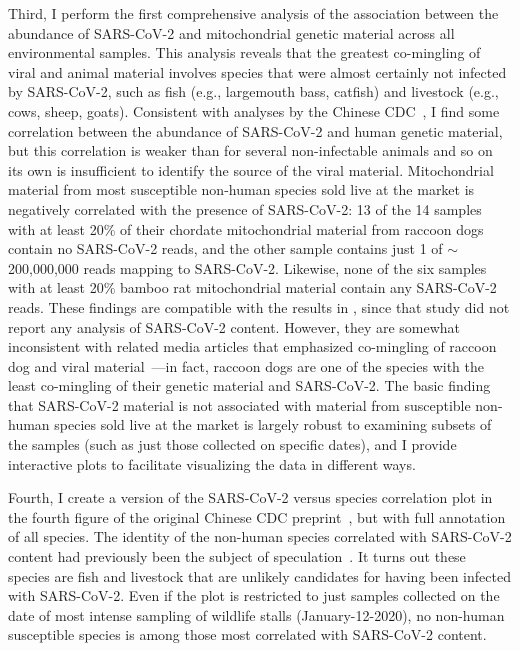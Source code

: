 \documentclass[9pt,twocolumn,twoside]{gsajnl_modified}
\begin{document}
Third, I perform the first comprehensive analysis of the association between the abundance of SARS-CoV-2 and mitochondrial genetic material across all environmental samples.
This analysis reveals that the greatest co-mingling of viral and animal material involves species that were almost certainly not infected by SARS-CoV-2, such as fish (e.g., largemouth bass, catfish) and livestock (e.g., cows, sheep, goats).
Consistent with analyses by the Chinese CDC~\citep{liu2022surveillance}, I find some correlation between the abundance of SARS-CoV-2 and human genetic material, but this correlation is weaker than for several non-infectable animals and so on its own is insufficient to identify the source of the viral material.
Mitochondrial material from most susceptible non-human species sold live at the market is negatively correlated with the presence of SARS-CoV-2: 13 of the 14 samples with at least 20\% of their chordate mitochondrial material from raccoon dogs contain no SARS-CoV-2 reads, and the other sample contains just 1 of $\sim$200,000,000 reads mapping to SARS-CoV-2.
Likewise, none of the six samples with at least 20\% bamboo rat mitochondrial material contain any SARS-CoV-2 reads.
These findings are compatible with the results in \citet{crits2023genetic}, since that study did not report any analysis of SARS-CoV-2 content.
However, they are somewhat inconsistent with related media articles that emphasized co-mingling of raccoon dog and viral material~\citep{wu2023atlantic,mueller2023nytimes}---in fact, raccoon dogs are one of the species with the least co-mingling of their genetic material and SARS-CoV-2.
The basic finding that SARS-CoV-2 material is not associated with material from susceptible non-human species sold live at the market is largely robust to examining subsets of the samples (such as just those collected on specific dates), and I provide interactive plots to facilitate visualizing the data in different ways.

Fourth, I create a version of the SARS-CoV-2 versus species correlation plot in the fourth figure of the original Chinese CDC preprint~\citep{liu2022surveillance}, but with full annotation of all species.
The identity of the non-human species correlated with SARS-CoV-2 content had previously been the subject of speculation~\citep{cohen2022anywhere, cohen2022studies, cohen2023unearthed}.
It turns out these species are fish and livestock that are unlikely candidates for having been infected with SARS-CoV-2.
Even if the plot is restricted to just samples collected on the date of most intense sampling of wildlife stalls (January-12-2020), no non-human susceptible species is among those most correlated with SARS-CoV-2 content. 
\end{document}

